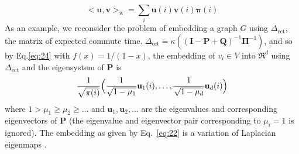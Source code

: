 \documentclass[10pt,twocolumn]{article}
\numberwithin{equation}{section}
\begin{document}
\begin{equation}
  \label{eq:25}
  <\mathbf{u},\mathbf{v}>_{\bm{\pi}} =
  \sum_{i}{\mathbf{u}(i)\mathbf{v}(i) \bm{\pi}(i)}
\end{equation}
As an example, we reconsider the problem of embedding a graph $G$
using $\Delta_{\mathrm{ect}}$, the matrix of expected commute time.
$\Delta_{\mathrm{ect}} = \kappa((\mathbf{I} - \mathbf{P} +
\mathbf{Q})^{-1}\bm{\Pi}^{-1})$, and so by Eq.\eqref{eq:24} with $f(x)
= 1/(1-x)$, the embedding of $v_i \in V$ into $\Re^{d}$ using
$\Delta_{\mathrm{ect}}$ and the eigensystem of $\mathbf{P}$ is
\begin{equation}
  \label{eq:22}
   \frac{1}{\sqrt{\pi(i)}} \Bigl(\frac{1}{\sqrt{1 - \mu_1}} \mathbf{u}_1(i),
    \dots, \frac{1}{\sqrt{1 - \mu_d}} \mathbf{u}_{d}(i)\Bigr)
\end{equation}
where $1 > \mu_1 \geq \mu_2 \geq \dots$ and $\mathbf{u}_1,
\mathbf{u}_2, \dots$ are the eigenvalues and corresponding
eigenvectors of $\mathbf{P}$ (the eigenvalue and eigenvector pair
corresponding to $\mu_i = 1$ is ignored). The embedding as given by
Eq.~\eqref{eq:22} is a variation of Laplacian eigenmaps
\cite{belkin03:_laplac}.  
%
\end{document}
